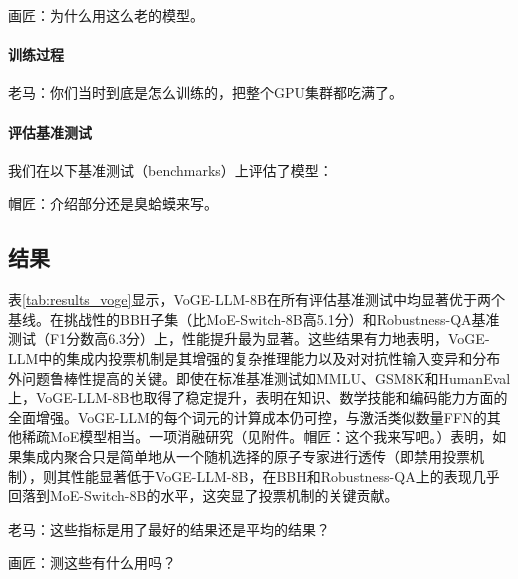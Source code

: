 {\kaiti 画匠：为什么用这么老的模型。}

\paragraph{训练过程}
{\kaiti 老马：你们当时到底是怎么训练的，把整个GPU集群都吃满了。}

\paragraph{评估基准测试}
我们在以下基准测试（benchmarks）上评估了模型：

{\kaiti 帽匠：介绍部分还是臭蛤蟆来写。}

\subsection{结果}
表\ref{tab:results_voge}显示，VoGE-LLM-8B在所有评估基准测试中均显著优于两个基线。在挑战性的BBH子集（比MoE-Switch-8B高5.1分）和Robustness-QA基准测试（F1分数高6.3分）上，性能提升最为显著。这些结果有力地表明，VoGE-LLM中的集成内投票机制是其增强的复杂推理能力以及对对抗性输入变异和分布外问题鲁棒性提高的关键。即使在标准基准测试如MMLU、GSM8K和HumanEval上，VoGE-LLM-8B也取得了稳定提升，表明在知识、数学技能和编码能力方面的全面增强。VoGE-LLM的每个词元的计算成本仍可控，与激活类似数量FFN的其他稀疏MoE模型相当。一项消融研究（见附件。{\kaiti 帽匠：这个我来写吧。}）表明，如果集成内聚合只是简单地从一个随机选择的原子专家进行透传（即禁用投票机制），则其性能显著低于VoGE-LLM-8B，在BBH和Robustness-QA上的表现几乎回落到MoE-Switch-8B的水平，这突显了投票机制的关键贡献。

{\kaiti 老马：这些指标是用了最好的结果还是平均的结果？}

{\kaiti 画匠：测这些有什么用吗？}

\begin{table}[b]
\centering
\caption{基准测试结果。VoGE-LLM-8B凭借其集成内投票机制，在复杂推理和鲁棒性方面显示出显著提升。{\kaiti 老马：Robust-QA是新出的测试集吗？}}
\label{tab:results_voge}
\end{table}

